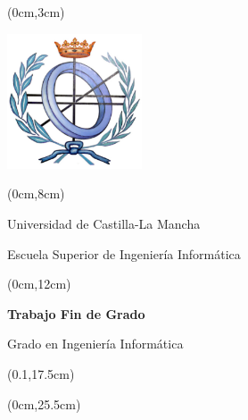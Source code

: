 % 
\pagestyle{empty}
\begin{titlepage}\null



\begin{textblock*}{\paperwidth}(0cm,3cm)
\begin{center}
\includegraphics[width=4cm]{figs/logoconciti.png}
\end{center}
\end{textblock*}


\begin{textblock*}{\paperwidth}(0cm,8cm) 
\begin{center}\doublespacing
{\fontsize{16pt}{2pt}\selectfont Universidad de Castilla-La Mancha}

{\fontsize{16pt}{2pt}\selectfont Escuela Superior de Ingeniería Informática}
\end{center}
\end{textblock*}


\begin{textblock*}{\paperwidth}(0cm,12cm) 
\begin{center}\doublespacing 
{\bf\fontsize{18pt}{4pt}\selectfont Trabajo Fin de Grado}

{\fontsize{18pt}{4pt}\selectfont Grado en Ingeniería Informática}

{\fontsize{16pt}{4pt}\selectfont \espec}
\end{center}
\end{textblock*}


\begin{textblock*}{0.8\paperwidth}(0.1\paperwidth,17.5cm) 
\begin{center}\doublespacing %
{\bf\fontsize{20pt}{4pt}\selectfont \titulo}

\vskip1cm
{\it \fontsize{18pt}{4pt}\selectfont \autor}
\end{center}
\end{textblock*}


\begin{textblock*}{\paperwidth}(0cm,25.5cm) 
\begin{center}
{\fontsize{14pt}{4pt}\selectfont \fecha}
\end{center}
\end{textblock*}
\end{titlepage}